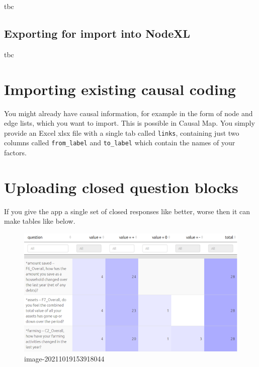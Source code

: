 \documentclass[
]{book}
\begin{document}
tbc

\hypertarget{exporting-for-import-into-nodexl}{%
\subsection{Exporting for import into NodeXL}\label{exporting-for-import-into-nodexl}}

tbc

\hypertarget{importing-existing-causal-coding}{%
\section{Importing existing causal coding}\label{importing-existing-causal-coding}}

You might already have causal information, for example in the form of node and edge lists, which you want to import. This is possible in Causal Map. You simply provide an Excel xlsx file with a single tab called \texttt{links}, containing just two columns called \texttt{from\_label} and \texttt{to\_label} which contain the names of your factors.

\hypertarget{uploading-closed-question-blocks}{%
\section{Uploading closed question blocks}\label{uploading-closed-question-blocks}}

If you give the app a single set of closed responses like better, worse then it can make tables like below.

\begin{figure}
\centering
\includegraphics[width=6.77083in,height=\textheight]{_assets/image-20211019153918044.png}
\caption{image-20211019153918044}
\end{figure}
\end{document}

